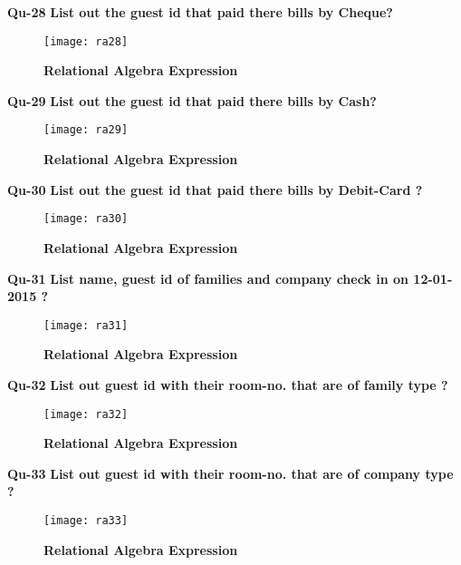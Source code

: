 \documentclass[a4,12pt]{report}
\begin{document}
\newpage
\textbf{Qu-28} \textbf{ List out the guest id that paid there bills by Cheque?
}\\

\begin{figure}[hbtp]
\centering
\texttt{[image: ra28]}
\caption{\textbf{{\color{red}Relational Algebra Expression}}}
\end{figure}


\textbf{Qu-29} \textbf{ List out the guest id that paid there bills by Cash?
}\\

\begin{figure}[hbtp]
\centering
\texttt{[image: ra29]}
\caption{\textbf{{\color{red}Relational Algebra Expression}}}
\end{figure}

\textbf{Qu-30} \textbf{ List out the guest id that paid there bills by Debit-Card ? }\\

\begin{figure}[hbtp]
\centering
\texttt{[image: ra30]}
\caption{\textbf{{\color{red}Relational Algebra Expression}}}
\end{figure}

\newpage
\textbf{Qu-31} \textbf{ List name, guest id of families and company check in on 12-01-2015 ? }\\

\begin{figure}[hbtp]
\centering
\texttt{[image: ra31]}
\caption{\textbf{{\color{red}Relational Algebra Expression}}}
\end{figure}

\textbf{Qu-32} \textbf{ List out guest id with their room-no. that are of family type ? }\\

\begin{figure}[hbtp]
\centering
\texttt{[image: ra32]}
\caption{\textbf{{\color{red}Relational Algebra Expression}}}
\end{figure}

\newpage
\textbf{Qu-33} \textbf{ List out guest id with their room-no. that are of company type ? }\\

\begin{figure}[hbtp]
\centering
\texttt{[image: ra33]}
\caption{\textbf{{\color{red}Relational Algebra Expression}}}
\end{figure}
\end{document}

